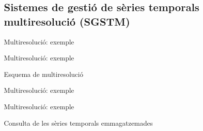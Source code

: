 \subsection[SGSTM]{Sistemes de gestió de sèries temporals multiresolució (SGSTM)}




\begin{frame}{Multiresolució: exemple}

\begin{center}

\end{center}

\end{frame}

\begin{frame}{Multiresolució: exemple}

Esquema de multiresolució

\begin{center}

\end{center}

\end{frame}

\begin{frame}{Multiresolució: exemple}


\begin{center}

\end{center}

\end{frame}

\begin{frame}{Multiresolució: exemple}

Consulta de les sèries temporals emmagatzemades

\begin{center}

\end{center}

\end{frame}




